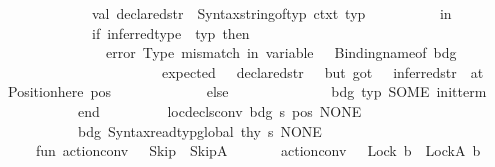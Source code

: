 \begin{isabellebody}
\ \ \ \ \ \ \ \ \ \ \ \ val\ declared{\isacharunderscore}{\kern0pt}str\ {\isacharequal}{\kern0pt}\ Syntax{\isachardot}{\kern0pt}string{\isacharunderscore}{\kern0pt}of{\isacharunderscore}{\kern0pt}typ\ ctxt\ typ\isanewline
\ \ \ \ \ \ \ \ \ \ in\isanewline
\ \ \ \ \ \ \ \ \ \ \ \ if\ inferred{\isacharunderscore}{\kern0pt}type\ {\isacharless}{\kern0pt}{\isachargreater}{\kern0pt}\ typ\ then\isanewline
\ \ \ \ \ \ \ \ \ \ \ \ \ \ error\ {\isacharparenleft}{\kern0pt}{\isachardoublequote}{\kern0pt}Type\ mismatch\ in\ variable\ {\isachardoublequote}{\kern0pt}\ {\isacharcircum}{\kern0pt}\ Binding{\isachardot}{\kern0pt}name{\isacharunderscore}{\kern0pt}of\ bdg\ {\isacharcircum}{\kern0pt}\isanewline
\ \ \ \ \ \ \ \ \ \ \ \ \ \ \ \ \ \ \ \ \ {\isachardoublequote}{\kern0pt}{\isacharcolon}{\kern0pt}\ expected\ {\isachardoublequote}{\kern0pt}\ {\isacharcircum}{\kern0pt}\ declared{\isacharunderscore}{\kern0pt}str\ {\isacharcircum}{\kern0pt}\ {\isachardoublequote}{\kern0pt}{\isacharcomma}{\kern0pt}\ but\ got\ {\isachardoublequote}{\kern0pt}\ {\isacharcircum}{\kern0pt}\ inferred{\isacharunderscore}{\kern0pt}str\ {\isacharcircum}{\kern0pt}\ {\isachardoublequote}{\kern0pt}at\ {\isachardoublequote}{\kern0pt}\ {\isacharcircum}{\kern0pt}\ Position{\isachardot}{\kern0pt}here\ pos\ {\isacharparenright}{\kern0pt}\isanewline
\ \ \ \ \ \ \ \ \ \ \ \ else\isanewline
\ \ \ \ \ \ \ \ \ \ \ \ \ \ {\isacharparenleft}{\kern0pt}{\isacharparenleft}{\kern0pt}bdg{\isacharcomma}{\kern0pt}\ typ{\isacharparenright}{\kern0pt}{\isacharcomma}{\kern0pt}\ SOME\ init{\isacharunderscore}{\kern0pt}term{\isacharparenright}{\kern0pt}\isanewline
\ \ \ \ \ \ \ \ \ \ end\isanewline
\ \ \ \ \ \ \ \ {\isacharbar}{\kern0pt}\ loc{\isacharunderscore}{\kern0pt}decls{\isacharunderscore}{\kern0pt}conv\ {\isacharparenleft}{\kern0pt}{\isacharparenleft}{\kern0pt}bdg{\isacharcomma}{\kern0pt}\ {\isacharparenleft}{\kern0pt}s{\isacharcomma}{\kern0pt}\ pos{\isacharparenright}{\kern0pt}{\isacharparenright}{\kern0pt}{\isacharcomma}{\kern0pt}\ NONE{\isacharparenright}{\kern0pt}\ {\isacharequal}{\kern0pt}\isanewline
\ \ \ \ \ \ \ \ \ \ {\isacharparenleft}{\kern0pt}{\isacharparenleft}{\kern0pt}bdg{\isacharcomma}{\kern0pt}\ Syntax{\isachardot}{\kern0pt}read{\isacharunderscore}{\kern0pt}typ{\isacharunderscore}{\kern0pt}global\ thy\ s{\isacharparenright}{\kern0pt}{\isacharcomma}{\kern0pt}\ NONE{\isacharparenright}{\kern0pt}\isanewline
\isanewline
\ \ \ \ fun\ action{\isacharunderscore}{\kern0pt}conv\ {\isacharunderscore}{\kern0pt}\ {\isacharunderscore}{\kern0pt}\ Skip\ {\isacharequal}{\kern0pt}\ SkipA\isanewline
\ \ \ \ \ \ {\isacharbar}{\kern0pt}\ action{\isacharunderscore}{\kern0pt}conv\ {\isacharunderscore}{\kern0pt}\ {\isacharunderscore}{\kern0pt}\ {\isacharparenleft}{\kern0pt}Lock\ b{\isacharparenright}{\kern0pt}\ {\isacharequal}{\kern0pt}\ LockA\ b\isanewline

\end{isabellebody}
